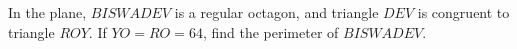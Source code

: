 In the plane, $BISWADEV$ is a regular octagon, and triangle $DEV$ is congruent to triangle $ROY$. If $YO=RO=64$, find the perimeter of $BISWADEV$.
